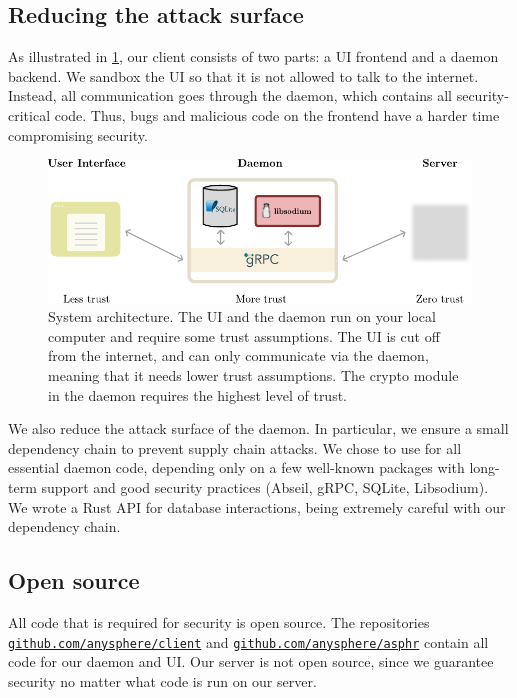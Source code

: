 \subsection{Reducing the attack surface}

As illustrated in \cref{fig:systemdiagram}, our client consists of two parts: a UI frontend and a daemon backend. We sandbox the UI so that it is not allowed to talk to the internet. Instead, all communication goes through the daemon, which contains all security-critical code. Thus, bugs and malicious code on the frontend have a harder time compromising security.
\begin{figure}[t!]
    \centering
    \includegraphics[width=\textwidth]{sysdiagramalt.pdf}
\caption{System architecture. The UI and the daemon run on your local computer and require some trust assumptions. The UI is cut off from the internet, and can only communicate via the daemon, meaning that it needs lower trust assumptions. The crypto module in the daemon requires the highest level of trust.}
\label{fig:systemdiagram}
\end{figure}

We also reduce the attack surface of the daemon. In particular, we ensure a small dependency chain to prevent supply chain attacks. We chose to use \Cpp for all essential daemon code, depending only on a few well-known packages with long-term support and good security practices (Abseil, gRPC, SQLite, Libsodium). We wrote a Rust API for database interactions, being extremely careful with our dependency chain. 


\subsection{Open source}

All code that is required for security is open source. The repositories \\ {\tt \href{https://github.com/anysphere/client}{github.com/anysphere/client}} and  {\tt \href{https://github.com/anysphere/asphr}{github.com/anysphere/asphr}} contain all code for our daemon and UI. Our server is not open source, since we guarantee security no matter what code is run on our server. 

